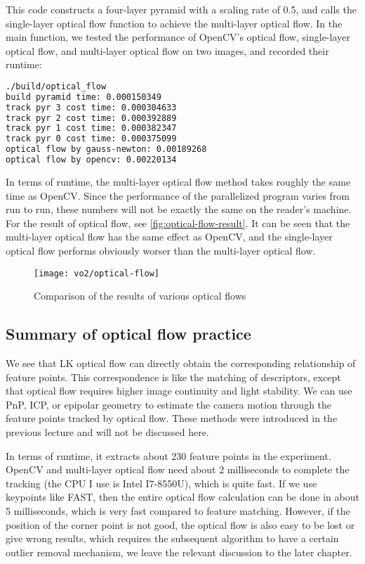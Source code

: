 {This code constructs a four-layer pyramid with a scaling rate of 0.5, and calls the single-layer optical flow function to achieve the multi-layer optical flow. In the main function, we tested the performance of OpenCV's optical flow, single-layer optical flow, and multi-layer optical flow on two images, and recorded their runtime:
\begin{lstlisting}[language=sh,caption=终端输入：]
./build/optical_flow
build pyramid time: 0.000150349
track pyr 3 cost time: 0.000304633
track pyr 2 cost time: 0.000392889
track pyr 1 cost time: 0.000382347
track pyr 0 cost time: 0.000375099
optical flow by gauss-newton: 0.00189268
optical flow by opencv: 0.00220134
\end{lstlisting}
In terms of runtime, the multi-layer optical flow method takes roughly the same time as OpenCV. Since the performance of the parallelized program varies from run to run, these numbers will not be exactly the same on the reader's machine. For the result of optical flow, see \autoref{fig:optical-flow-result}. It can be seen that the multi-layer optical flow has the same effect as OpenCV, and the single-layer optical flow performs obviously worser than the multi-layer optical flow.

\begin{figure}[!htp]
	\centering
	\texttt{[image: vo2/optical-flow]}
	\caption{Comparison of the results of various optical flows}
	\label{fig:optical-flow-result}
\end{figure}

\subsection{Summary of optical flow practice}
We see that LK optical flow can directly obtain the corresponding relationship of feature points. This correspondence is like the matching of descriptors, except that optical flow requires higher image continuity and light stability. We can use PnP, ICP, or epipolar geometry to estimate the camera motion through the feature points tracked by optical flow. These methods were introduced in the previous lecture and will not be discussed here.

In terms of runtime, it extracts about 230 feature points in the experiment. OpenCV and multi-layer optical flow need about 2 milliseconds to complete the tracking (the CPU I use is Intel I7-8550U), which is quite fast. If we use keypoints like FAST, then the entire optical flow calculation can be done in about 5 milliseconds, which is very fast compared to feature matching. However, if the position of the corner point is not good, the optical flow is also easy to be lost or give wrong results, which requires the subsequent algorithm to have a certain outlier removal mechanism, we leave the relevant discussion to the later chapter.

}
